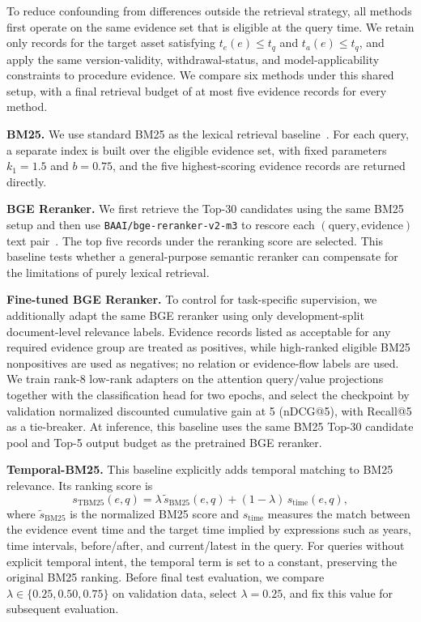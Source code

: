 To reduce confounding from differences outside the retrieval strategy, all methods first operate on the same evidence set that is eligible at the query time. We retain only records for the target asset satisfying
$t_e(e)\le t_q$ and $t_a(e)\le t_q$, and apply the same version-validity, withdrawal-status, and model-applicability constraints to procedure evidence. We compare six methods under this shared setup, with a final retrieval budget of at most five evidence records for every method.

\textbf{BM25.}
We use standard BM25 as the lexical retrieval baseline~\cite{robertson2009bm25}. For each query, a separate index is built over the eligible evidence set, with fixed parameters $k_1=1.5$ and $b=0.75$, and the five highest-scoring evidence records are returned directly.

\textbf{BGE Reranker.}
We first retrieve the Top-30 candidates using the same BM25 setup and then use \texttt{BAAI/bge-reranker-v2-m3} to rescore each $(\text{query},\text{evidence})$ text pair~\cite{chen2024bgem3,flagembedding2026reranker}. The top five records under the reranking score are selected. This baseline tests whether a general-purpose semantic reranker can compensate for the limitations of purely lexical retrieval.

\textbf{Fine-tuned BGE Reranker.}
To control for task-specific supervision, we additionally adapt the same BGE reranker using only development-split document-level relevance labels. Evidence records listed as acceptable for any required evidence group are treated as positives, while high-ranked eligible BM25 nonpositives are used as negatives; no relation or evidence-flow labels are used. We train rank-8 low-rank adapters on the attention query/value projections together with the classification head for two epochs, and select the checkpoint by validation normalized discounted cumulative gain at 5 (nDCG@5), with Recall@5 as a tie-breaker. At inference, this baseline uses the same BM25 Top-30 candidate pool and Top-5 output budget as the pretrained BGE reranker.

\textbf{Temporal-BM25.}
This baseline explicitly adds temporal matching to BM25 relevance. Its ranking score is
\begin{equation}
s_{\mathrm{TBM25}}(e,q)
=
\lambda\,\widetilde{s}_{\mathrm{BM25}}(e,q)
+
(1-\lambda)\,s_{\mathrm{time}}(e,q),
\end{equation}
where $\widetilde{s}_{\mathrm{BM25}}$ is the normalized BM25 score and $s_{\mathrm{time}}$ measures the match between the evidence event time and the target time implied by expressions such as years, time intervals, before/after, and current/latest in the query. For queries without explicit temporal intent, the temporal term is set to a constant, preserving the original BM25 ranking. Before final test evaluation, we compare $\lambda\in\{0.25,0.50,0.75\}$ on validation data, select $\lambda=0.25$, and fix this value for subsequent evaluation.


